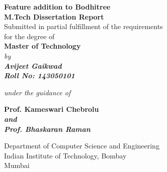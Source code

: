 \documentclass[12pt]{article}
\begin{document}
%
\begin{titlepage}
{\centering     
\large
{\Large\textbf{Feature addition to Bodhitree}}\\
\vspace{1cm}
\textbf{M.Tech Dissertation Report}\vspace{1cm} \\
Submitted in partial fulfillment of the requirements\\
for the degree of
\vspace{.5cm} \\
\textbf{Master of Technology}
\vspace{1cm}
\normalsize
\\ \it{by} \\
\vspace{.5cm}
\rm
{\large \textbf{Avijeet Gaikwad}}\\
{\large \textbf {Roll No: 143050101}}

\vspace{1cm}

{\it{under the guidance of}} \\
\vspace{.5cm}

\hspace{.05cm} {\large \bf {Prof. Kameswari Chebrolu} \\ \it{and}  \\ \large \bf {Prof. Bhaskaran Raman}}\\
\vspace {1cm}

\begin{figure}[h] 
{\par}
\end{figure}

Department of Computer Science and Engineering \\ 
Indian Institute of Technology, Bombay\\
{\centering
\hspace{7cm}Mumbai} 
}
\end{titlepage}
\pagebreak
\cleardoublepage
{}

\tableofcontents
\cleardoublepage
{}
\end{document}
